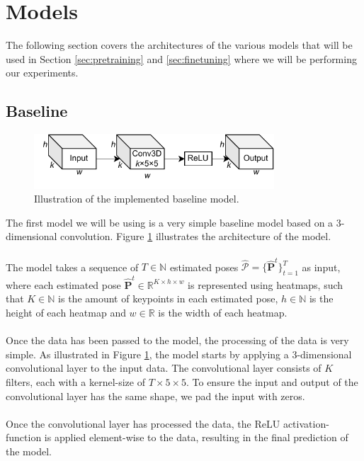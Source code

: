 \documentclass[./main.tex]{subfiles}
\begin{document}
\section{Models}
The following section covers the architectures of the various models that will be used in Section \ref{sec:pretraining} and \ref{sec:finetuning} where we will be performing our experiments. 

\subsection{Baseline}
\begin{figure}[htbp]
    \centering
    \includegraphics[width=0.8\textwidth]{./entities/baseline.pdf}
    \caption{Illustration of the implemented baseline model.}
    \label{fig:baseline}
\end{figure}

\noindent The first model we will be using is a very simple baseline model based on a 3-dimensional convolution. Figure \ref{fig:baseline} illustrates the architecture of the model.
\\
\\
The model takes a sequence of $T \in \mathbb{N}$ estimated poses $\hat{\mathcal{P}} = \{\hat{\bm{P}}^t\}_{t = 1} ^T$ as input, where each estimated pose $\hat{\bm{P}}^t \in \mathbb{R}^{K \times h \times w}$ is represented using heatmaps, such that $K \in \mathbb{N}$ is the amount of keypoints in each estimated pose, $h \in \mathbb{N}$ is the height of each heatmap and $w \in \mathbb{R}$ is the width of each heatmap.
\\
\\
Once the data has been passed to the model, the processing of the data is very simple. As illustrated in Figure \ref{fig:baseline}, the model starts by applying a 3-dimensional convolutional layer to the input data. The convolutional layer consists of $K$ filters, each with a kernel-size of $T \times 5 \times 5$. To ensure the input and output of the convolutional layer has the same shape, we pad the input with zeros.
\\
\\
Once the convolutional layer has processed the data, the ReLU activation-function is applied element-wise to the data, resulting in the final prediction of the model.
\end{document}
